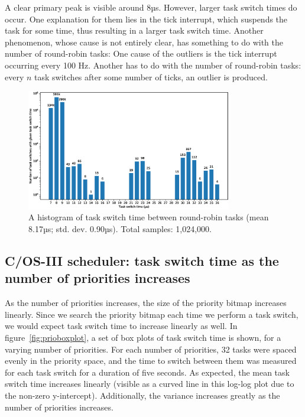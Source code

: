 \documentclass[twoside]{uva-inf-bachelor-thesis}
\newcommand{\ucosiii}{\textmu C/OS-III\xspace}
\begin{document}
A clear primary peak is visible around 8µs. However, larger task switch times do occur. One explanation for them lies in the tick interrupt, which suspends the task for some time, thus resulting in a larger task switch time. Another phenomenon, whose cause is not entirely clear, has something to do with the number of round-robin tasks:  One cause of the outliers is the tick interrupt occurring every 100 Hz. Another has to do with the number of round-robin tasks: every $n$ task switches after some number of ticks, an outlier is produced.

\begin{figure}[htpb]
    \centering
    \includegraphics[width=0.8\textwidth]{task_switch_time.eps}
    \caption{A histogram of task switch time between round-robin tasks (mean 8.17µs; std. dev. 0.90µs). Total samples: 1,024,000.}
    \label{fig:rrhist}
\end{figure}

\subsection{\ucosiii scheduler: task switch time as the number of priorities increases}
As the number of priorities increases, the size of the priority bitmap increases linearly. Since we search the priority bitmap each time we perform a task switch, we would expect task switch time to increase linearly as well. In figure~\ref{fig:prioboxplot}, a set of box plots of task switch time is shown, for a varying number of priorities. For each number of priorities, 32 tasks were spaced evenly in the priority space, and the time to switch between them was measured for each task switch for a duration of five seconds. As expected, the mean task switch time increases linearly (visible as a curved line in this log-log plot due to the non-zero y-intercept). Additionally, the variance increases greatly as the number of priorities increases.
\end{document}
